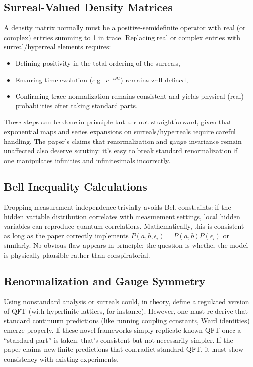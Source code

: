 \documentclass[11pt]{article}
\begin{document}
\subsection{Surreal-Valued Density Matrices}
A density matrix normally must be a positive-semidefinite operator with real (or complex) entries summing to 1 in trace. Replacing real or complex entries with surreal/hyperreal elements requires:

\begin{itemize}
  \item Defining positivity in the total ordering of the surreals,
  \item Ensuring time evolution (e.g.\ $e^{-i H t}$) remains well-defined,
  \item Confirming trace-normalization remains consistent and yields physical (real) probabilities after taking standard parts.
\end{itemize}

\noindent These steps can be done in principle but are not straightforward, given that exponential maps and series expansions on surreals/hyperreals require careful handling. The paper’s claims that renormalization and gauge invariance remain unaffected also deserve scrutiny: it's easy to break standard renormalization if one manipulates infinities and infinitesimals incorrectly.

\subsection{Bell Inequality Calculations}
Dropping measurement independence trivially avoids Bell constraints: if the hidden variable distribution correlates with measurement settings, local hidden variables can reproduce quantum correlations. Mathematically, this is consistent as long as the paper correctly implements $P(a,b,\epsilon_i) = P(a,b) P(\epsilon_i)$ or similarly. No obvious flaw appears in principle; the question is whether the model is physically plausible rather than conspiratorial.

\subsection{Renormalization and Gauge Symmetry}
Using nonstandard analysis or surreals could, in theory, define a regulated version of QFT (with hyperfinite lattices, for instance). However, one must re-derive that standard continuum predictions (like running coupling constants, Ward identities) emerge properly. If these novel frameworks simply replicate known QFT once a ``standard part'' is taken, that's consistent but not necessarily simpler. If the paper claims new finite predictions that contradict standard QFT, it must show consistency with existing experiments. 
\end{document}
